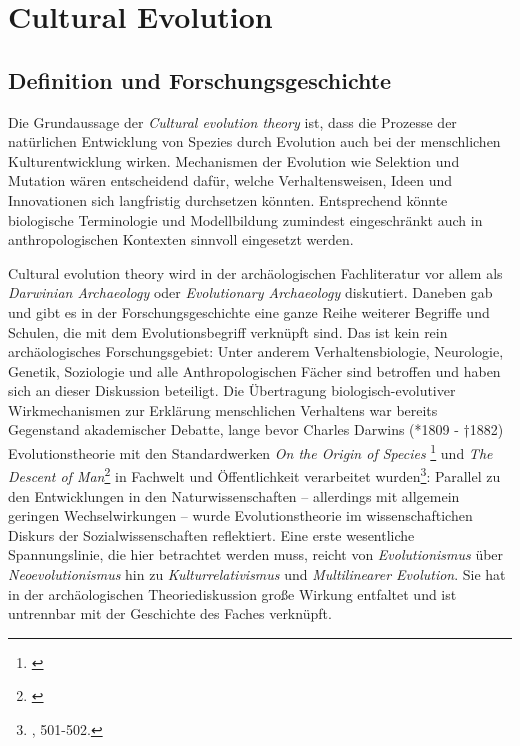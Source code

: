 \documentclass[openany,twoside,twocolumn]{book}
\let\rmarkdownfootnote\footnote%
\def\footnote{\protect\rmarkdownfootnote}
\begin{document}
\hypertarget{cultural-evolution}{%
\chapter{Cultural Evolution}\label{cultural-evolution}}

\hypertarget{definition-und-forschungsgeschichte}{%
\section{Definition und
Forschungsgeschichte}\label{definition-und-forschungsgeschichte}}

Die Grundaussage der \emph{Cultural evolution theory} ist, dass die
Prozesse der natürlichen Entwicklung von Spezies durch Evolution auch
bei der menschlichen Kulturentwicklung wirken. Mechanismen der Evolution
wie Selektion und Mutation wären entscheidend dafür, welche
Verhaltensweisen, Ideen und Innovationen sich langfristig durchsetzen
könnten. Entsprechend könnte biologische Terminologie und Modellbildung
zumindest eingeschränkt auch in anthropologischen Kontexten sinnvoll
eingesetzt werden.

Cultural evolution theory wird in der archäologischen Fachliteratur vor
allem als \emph{Darwinian Archaeology} oder \emph{Evolutionary
Archaeology} diskutiert. Daneben gab und gibt es in der
Forschungsgeschichte eine ganze Reihe weiterer Begriffe und Schulen, die
mit dem Evolutionsbegriff verknüpft sind. Das ist kein rein
archäologisches Forschungsgebiet: Unter anderem Verhaltensbiologie,
Neurologie, Genetik, Soziologie und alle Anthropologischen Fächer sind
betroffen und haben sich an dieser Diskussion beteiligt. Die Übertragung
biologisch-evolutiver Wirkmechanismen zur Erklärung menschlichen
Verhaltens war bereits Gegenstand akademischer Debatte, lange bevor
Charles Darwins (*1809 - †1882) Evolutionstheorie mit den Standardwerken
\emph{On the Origin of Species} \footnote{\textcite{Darwinoriginspeciesmeans1859}}
und \emph{The Descent of Man}\footnote{\textcite{Darwindescentmanselection1871}}
in Fachwelt und Öffentlichkeit verarbeitet wurden\footnote{\textcite{petermann_geschichte_2004},
  501-502.}: Parallel zu den Entwicklungen in den Naturwissenschaften --
allerdings mit allgemein geringen Wechselwirkungen -- wurde
Evolutionstheorie im wissenschaftichen Diskurs der Sozialwissenschaften
reflektiert. Eine erste wesentliche Spannungslinie, die hier betrachtet
werden muss, reicht von \emph{Evolutionismus} über
\emph{Neoevolutionismus} hin zu \emph{Kulturrelativismus} und
\emph{Multilinearer Evolution}. Sie hat in der archäologischen
Theoriediskussion große Wirkung entfaltet und ist untrennbar mit der
Geschichte des Faches verknüpft.
\end{document}
